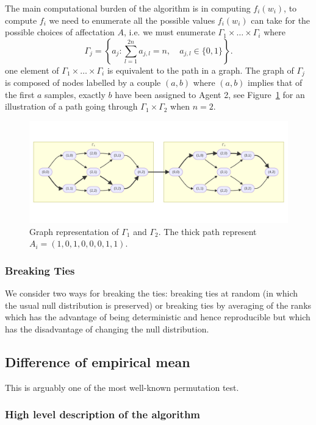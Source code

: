 \documentclass{article}
\theoremstyle{plain}
\theoremstyle{remark}
\newcommand{\1}{\mathbbm{1}}
\numberwithin{equation}{section}
\begin{document}
The main computational burden of the algorithm is in computing $f_i(w_i)$, to compute $f_i$ we need to enumerate all the possible values $f_i(w_i)$ can take for the possible choices of affectation $A$, i.e. we must enumerate $\Gamma_1 \times \dots \times \Gamma_i$ where
$$\Gamma_j= \left\{a_j: \sum_{l=1}^{2n}a_{j,l} = n,\quad a_{j,l}\in \{0,1 \}\right\}.$$
one element of $\Gamma_1 \times \dots \times \Gamma_i$ is equivalent to the path in a graph. The graph of $\Gamma_j$ is composed of nodes labelled by a couple $(a,b)$ where $(a,b)$ implies that of the first $a$ samples, exactly $b$ have been assigned to Agent 2, see Figure~\ref{fig:graph} for an illustration of a path going through $\Gamma_1\times \Gamma_2$ when $n=2$.
\begin{figure}[h!]
\begin{center}
\includegraphics[scale=0.7]{graph_gamma.pdf}
\caption{Graph representation of $\Gamma_1$ and $\Gamma_2$. The thick path represent $A_i=(1,0,1,0,0,0,1,1)$\label{fig:graph}.}
\end{center}
\end{figure}

\subsubsection{Breaking Ties}
We consider two ways for breaking the ties: breaking ties at random (in which the usual null distribution is preserved) or breaking ties by averaging of the ranks which has the advantage of being deterministic and hence reproducible but which has the disadvantage of changing the null distribution.

\subsection{Difference of empirical mean}
This is arguably one of the most well-known permutation test.

\subsubsection{High level description of the algorithm}
\end{document}
